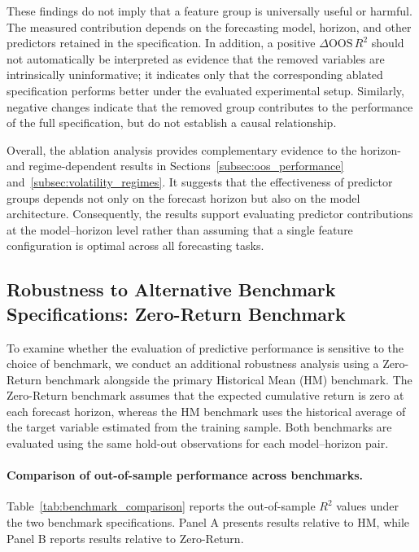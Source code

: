 \documentclass[12pt,twoside]{ord}
\makeatletter
\providecommand{\FloatBarrier}{\par\ifx\@deferlist\@empty\else\clearpage\fi}
\makeatother
\begin{document}
These findings do not imply that a feature group is universally useful or harmful. The measured contribution depends on the forecasting model, horizon, and other predictors retained in the specification. In addition, a positive $\Delta \mathrm{OOS}\,R^2$ should not automatically be interpreted as evidence that the removed variables are intrinsically uninformative; it indicates only that the corresponding ablated specification performs better under the evaluated experimental setup. Similarly, negative changes indicate that the removed group contributes to the performance of the full specification, but do not establish a causal relationship.

Overall, the ablation analysis provides complementary evidence to the horizon- and regime-dependent results in Sections~\ref{subsec:oos_performance} and~\ref{subsec:volatility_regimes}. It suggests that the effectiveness of predictor groups depends not only on the forecast horizon but also on the model architecture. Consequently, the results support evaluating predictor contributions at the model--horizon level rather than assuming that a single feature configuration is optimal across all forecasting tasks.

\FloatBarrier

\subsection{Robustness to Alternative Benchmark Specifications: Zero-Return Benchmark}\label{subsec:benchmark_robustness}

To examine whether the evaluation of predictive performance is sensitive to the choice of benchmark, we conduct an additional robustness analysis using a Zero-Return benchmark alongside the primary Historical Mean (HM) benchmark. The Zero-Return benchmark assumes that the expected cumulative return is zero at each forecast horizon, whereas the HM benchmark uses the historical average of the target variable estimated from the training sample. Both benchmarks are evaluated using the same hold-out observations for each model--horizon pair.

\paragraph{Comparison of out-of-sample performance across benchmarks.} Table~\ref{tab:benchmark_comparison} reports the out-of-sample \(R^2\) values under the two benchmark specifications. Panel A presents results relative to HM, while Panel B reports results relative to Zero-Return.
\end{document}
